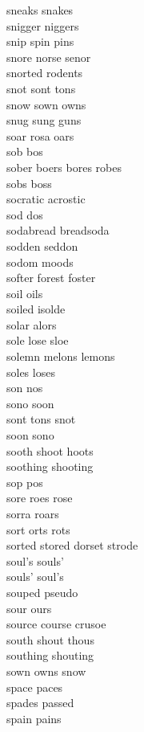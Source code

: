 sneaks snakes\\
snigger niggers\\
snip spin pins\\
snore norse senor\\
snorted rodents\\
snot sont tons\\
snow sown owns\\
snug sung guns\\
soar rosa oars\\
sob bos\\
sober boers bores robes\\
sobs boss\\
socratic acrostic\\
sod dos\\
sodabread breadsoda\\
sodden seddon\\
sodom moods\\
softer forest foster\\
soil oils\\
soiled isolde\\
solar alors\\
sole lose sloe\\
solemn melons lemons\\
soles loses\\
son nos\\
sono soon\\
sont tons snot\\
soon sono\\
sooth shoot hoots\\
soothing shooting\\
sop pos\\
sore roes rose\\
sorra roars\\
sort orts rots\\
sorted stored dorset strode\\
soul's souls'\\
souls' soul's\\
souped pseudo\\
sour ours\\
source course crusoe\\
south shout thous\\
southing shouting\\
sown owns snow\\
space paces\\
spades passed\\
spain pains\\
